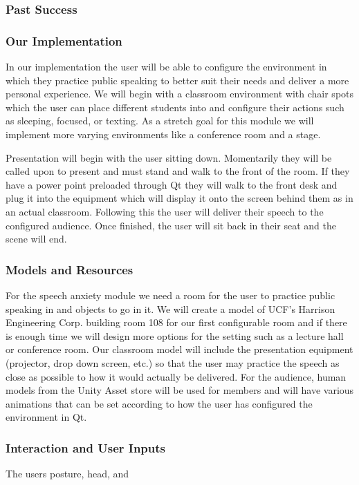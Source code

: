 \documentclass[a4paper,10pt]{article}
\begin{document}
\subsubsection{Past Success}

\subsubsection{Our Implementation}
In our implementation the user will be able to configure the environment in which they practice public speaking to better suit their needs and deliver a more personal experience. We will begin with a classroom environment with chair spots which the user can place different students into and configure their actions such as sleeping, focused, or texting. As a stretch goal for this module we will implement more varying environments like a conference room and a stage.

Presentation will begin with the user sitting down. Momentarily they will be called upon to present and must stand and walk to the front of the room. If they have a power point preloaded through Qt they will walk to the front desk and plug it into the equipment which will display it onto the screen behind them as in an actual classroom. Following this the user will deliver their speech to the configured audience. Once finished, the user will sit back in their seat and the scene will end.

\subsubsection{Models and Resources}
For the speech anxiety module we need a room for the user to practice public speaking in and objects to go in it. We will create a model of UCF's Harrison Engineering Corp. building room 108 for our first configurable room and if there is enough time we will design more options for the setting such as a lecture hall or conference room. Our classroom model will include the presentation equipment (projector, drop down screen, etc.) so that the user may practice the speech as close as possible to how it would actually be delivered. For the audience, human models from the Unity Asset store will be used for members and will have various animations that can be set according to how the user has configured the environment in Qt.

\subsubsection{Interaction and User Inputs}
The users posture, head, and 
\end{document}
